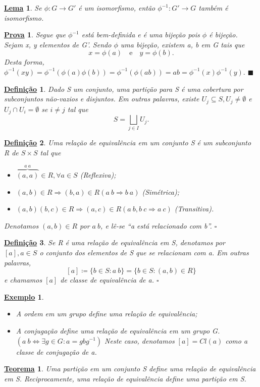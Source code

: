 \documentclass{article}
\newtheorem*{def*}{\underline{Defini\c c\~ao}}
\newtheorem*{theorem*}{\underline{Teorema}}
\newtheorem{example*}{\underline{Exemplo}}
\newtheorem*{proof*}{\underline{Prova}}
\newtheorem*{lemma*}{\underline{Lema}}
\renewcommand\qedsymbol{$\blacksquare$}
\begin{document}
\begin{lemma*}
  Se $\phi:G\rightarrow G'$ \'e um isomorfismo, ent\~ao $\phi^{-1}:G'\rightarrow G$ tamb\'em \'e isomorfismo. 
\end{lemma*}
\begin{proof*}
  Segue que $\phi^{-1}$ est\'a bem-definida e \'e uma bije\c c\~ao pois $\phi$ \'e bije\c c\~ao. Sejam x, y elementos de G'.
Sendo $\phi$ uma bije\c c\~ao, existem a, b em G tais que 
  $$
  x = \phi(a)\quad\text{e}\quad y = \phi(b).
  $$
  Desta forma, $\phi^{-1}(xy) = \phi^{-1}(\phi(a)\phi(b)) = \phi^{-1}(\phi(ab)) = ab = \phi^{-1}(x)\phi^{-1}(y).$ \qedsymbol
\end{proof*}
 \begin{def*}
   Dado S um conjunto, uma parti\c c\~ao para S \'e uma cobertura por subconjuntos n\~ao-vazios e disjuntos. Em outras palavras,
existe $U_{j}\subseteq{S}, U_{j}\neq\emptyset$ e $U_{j}\cap U_{i} = \emptyset$ se $i\neq j$ tal que 
  $$
    S = \bigsqcup_{j\in I}U_{j}.
  $$
 \end{def*}
\begin{def*}
  Uma rela\c c\~ao de equival\^encia em um conjunto S \'e um subconjunto R de $S\times S$ tal que 
 \begin{itemize}
   \item[-]$\overbrace{(a, a)}^{a~a}\in R, \forall a\in S$ (Reflexiva);
   \item[-]$(a, b)\in R \Rightarrow (b, a)\in R (a~b \Rightarrow b~a)$ (Sim\'etrica);
   \item[-]$(a, b)(b, c)\in R \Rightarrow (a, c)\in R (a~b, b~c \Rightarrow a~c)$ (Transitiva).
 \end{itemize}
 Denotamos $(a, b)\in R$ por $a~b$, e l\^e-se ``a est\'a relacionado com b''. $\square$
\end{def*}
 \begin{def*}
   Se R \'e uma rela\c c\~ao de equival\^encia em S, denotamos por $[a], a\in S$ o conjunto dos elementos de S que se relacionam com a. Em outras palavras, 
     $$
     [a]\coloneqq\{b\in S: a~b\} = \{b\in S: (a, b)\in R\}
     $$
     e chamamos $[a]$ de classe de equival\^encia de a. $\square$
 \end{def*}
\begin{example*}
 \begin{itemize}
   \item[1)] A ordem em um grupo define uma rela\c c\~ao de equival\^encia;
   \item[2)] A conjuga\c c\~ao define uma rela\c c\~ao de equival\^encia em um grupo G. $(a~b \Longleftrightarrow \exists g\in G: a = gbg^{-1})$
     Neste caso, denotamos $[a] = Cl(a)$ como a classe de conjuga\c c\~ao de a.
 \end{itemize}
\end{example*}
\begin{theorem*}
  Uma parti\c c\~ao em um conjunto S define uma rela\c c\~ao de equival\^encia em S. Reciprocamente, uma rela\c c\~ao de 
equival\^encia define uma parti\c c\~ao em S.
\end{theorem*}
\end{document}
